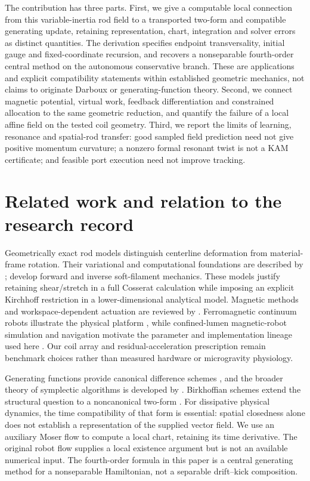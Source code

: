 The contribution has three parts. First, we give a computable local connection from this variable-inertia rod field to a transported two-form and compatible generating update, retaining representation, chart, integration and solver errors as distinct quantities. The derivation specifies endpoint transversality, initial gauge and fixed-coordinate recursion, and recovers a nonseparable fourth-order central method on the autonomous conservative branch. These are applications and explicit compatibility statements within established geometric mechanics, not claims to originate Darboux or generating-function theory. Second, we connect magnetic potential, virtual work, feedback differentiation and constrained allocation to the same geometric reduction, and quantify the failure of a local affine field on the tested coil geometry. Third, we report the limits of learning, resonance and spatial-rod transfer: good sampled field prediction need not give positive momentum curvature; a nonzero formal resonant twist is not a KAM certificate; and feasible port execution need not improve tracking.

\section{Related work and relation to the research record}
Geometrically exact rod models distinguish centerline deformation from material-frame rotation. Their variational and computational foundations are described by \citet{Antman2005,Simo1985}; \citet{Gazzola2018} develop forward and inverse soft-filament mechanics. These models justify retaining shear/stretch in a full Cosserat calculation while imposing an explicit Kirchhoff restriction in a lower-dimensional analytical model. Magnetic methods and workspace-dependent actuation are reviewed by \citet{Abbott2020}. Ferromagnetic continuum robots illustrate the physical platform \citep{Kim2019}, while confined-lumen magnetic-robot simulation and navigation motivate the parameter and implementation lineage used here \citep{Tong2025}. Our coil array and residual-acceleration prescription remain benchmark choices rather than measured hardware or microgravity physiology.

Generating functions provide canonical difference schemes \citep{Feng1989}, and the broader theory of symplectic algorithms is developed by \citet{FengQin2010,Hairer2006}. Birkhoffian schemes extend the structural question to a noncanonical two-form \citep{Su2007}. For dissipative physical dynamics, the time compatibility of that form is essential: spatial closedness alone does not establish a representation of the supplied vector field. We use an auxiliary Moser flow to compute a local chart, retaining its time derivative. The original robot flow supplies a local existence argument but is not an available numerical input. The fourth-order formula in this paper is a central generating method for a nonseparable Hamiltonian, not a separable drift--kick composition.

